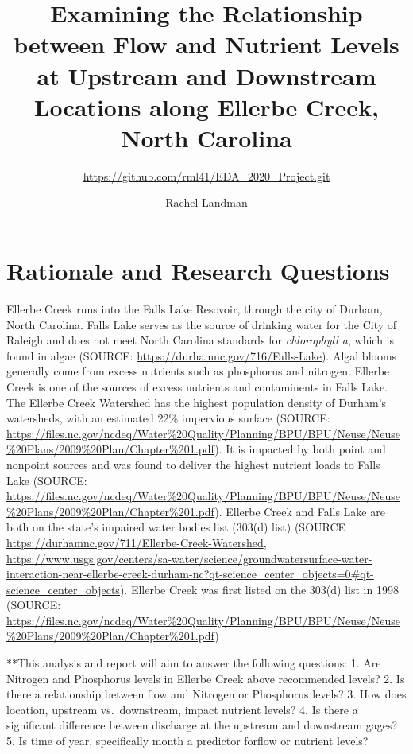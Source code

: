 \documentclass[12pt,]{article}
\title{Examining the Relationship between Flow and Nutrient Levels at Upstream
and Downstream Locations along Ellerbe Creek, North Carolina}
\subtitle{\url{https://github.com/rml41/EDA_2020_Project.git}}
\author{Rachel Landman}
\date{}
\begin{document}
\maketitle

\newpage
\tableofcontents 
\newpage
\listoftables 
\newpage
\listoffigures 
\newpage

\hypertarget{rationale-and-research-questions}{%
\section{Rationale and Research
Questions}\label{rationale-and-research-questions}}

Ellerbe Creek runs into the Falls Lake Resovoir, through the city of
Durham, North Carolina. Falls Lake serves as the source of drinking
water for the City of Raleigh and does not meet North Carolina standards
for \emph{chlorophyll a}, which is found in algae (SOURCE:
\url{https://durhamnc.gov/716/Falls-Lake}). Algal blooms generally come
from excess nutrients such as phosphorus and nitrogen. Ellerbe Creek is
one of the sources of excess nutrients and contaminents in Falls Lake.
The Ellerbe Creek Watershed has the highest population density of
Durham's watersheds, with an estimated 22\% impervious surface (SOURCE:
\url{https://files.nc.gov/ncdeq/Water\%20Quality/Planning/BPU/BPU/Neuse/Neuse\%20Plans/2009\%20Plan/Chapter\%201.pdf}).
It is impacted by both point and nonpoint sources and was found to
deliver the highest nutrient loads to Falls Lake (SOURCE:
\url{https://files.nc.gov/ncdeq/Water\%20Quality/Planning/BPU/BPU/Neuse/Neuse\%20Plans/2009\%20Plan/Chapter\%201.pdf}).
Ellerbe Creek and Falls Lake are both on the state's impaired water
bodies list (303(d) list) (SOURCE
\url{https://durhamnc.gov/711/Ellerbe-Creek-Watershed},
\url{https://www.usgs.gov/centers/sa-water/science/groundwatersurface-water-interaction-near-ellerbe-creek-durham-nc?qt-science_center_objects=0\#qt-science_center_objects}).
Ellerbe Creek was first listed on the 303(d) list in 1998 (SOURCE:
\url{https://files.nc.gov/ncdeq/Water\%20Quality/Planning/BPU/BPU/Neuse/Neuse\%20Plans/2009\%20Plan/Chapter\%201.pdf})

**This analysis and report will aim to answer the following questions:
1. Are Nitrogen and Phosphorus levels in Ellerbe Creek above recommended
levels? 2. Is there a relationship between flow and Nitrogen or
Phosphorus levels? 3. How does location, upstream vs.~downstream, impact
nutrient levels? 4. Is there a significant difference between discharge
at the upstream and downstream gages? 5. Is time of year, specifically
month a predictor forflow or nutrient levels?
\end{document}
